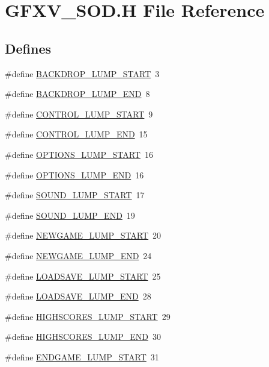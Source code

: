 \hypertarget{GFXV__SOD_8H}{
\section{GFXV\_\-SOD.H File Reference}
\label{GFXV__SOD_8H}
}
\subsection*{Defines}
\begin{DoxyCompactItemize}
\item 
\#define \hyperlink{GFXV__SOD_8H_adca5aa22f771fbd057c3a4356d982fb7}{BACKDROP\_\-LUMP\_\-START}~3
\item 
\#define \hyperlink{GFXV__SOD_8H_a68a24fd26f7eabc37dc80033e5872347}{BACKDROP\_\-LUMP\_\-END}~8
\item 
\#define \hyperlink{GFXV__SOD_8H_a75ff432d9ba8b9fe543c629b2a83f7fc}{CONTROL\_\-LUMP\_\-START}~9
\item 
\#define \hyperlink{GFXV__SOD_8H_ae6b5809ca4fa11ac02d20e267ad8b089}{CONTROL\_\-LUMP\_\-END}~15
\item 
\#define \hyperlink{GFXV__SOD_8H_ae9292998e373edbc6fc0fdb546f74657}{OPTIONS\_\-LUMP\_\-START}~16
\item 
\#define \hyperlink{GFXV__SOD_8H_ad3d257cd7112ba25f592d70faa282c03}{OPTIONS\_\-LUMP\_\-END}~16
\item 
\#define \hyperlink{GFXV__SOD_8H_a08adf27ac9c0ad4e9ebcfe26fef4b598}{SOUND\_\-LUMP\_\-START}~17
\item 
\#define \hyperlink{GFXV__SOD_8H_a37bad6ec4f5f567283a14469c99417d1}{SOUND\_\-LUMP\_\-END}~19
\item 
\#define \hyperlink{GFXV__SOD_8H_abb2bb967376d31f82376d5656dc3e054}{NEWGAME\_\-LUMP\_\-START}~20
\item 
\#define \hyperlink{GFXV__SOD_8H_ad8ccaab82ba48373db06f8accb144590}{NEWGAME\_\-LUMP\_\-END}~24
\item 
\#define \hyperlink{GFXV__SOD_8H_a8ec21621aee0ac9bcb1d3cb51a0c64af}{LOADSAVE\_\-LUMP\_\-START}~25
\item 
\#define \hyperlink{GFXV__SOD_8H_af3437d258aae461ec5bbc643949f15ba}{LOADSAVE\_\-LUMP\_\-END}~28
\item 
\#define \hyperlink{GFXV__SOD_8H_a1dc771ff501b4ccc5ac56b659b8006db}{HIGHSCORES\_\-LUMP\_\-START}~29
\item 
\#define \hyperlink{GFXV__SOD_8H_ae83c660f8b0c218c7c7a502da844f235}{HIGHSCORES\_\-LUMP\_\-END}~30
\item 
\#define \hyperlink{GFXV__SOD_8H_a1a355220b43be678719452742547a422}{ENDGAME\_\-LUMP\_\-START}~31

\end{DoxyCompactItemize}
